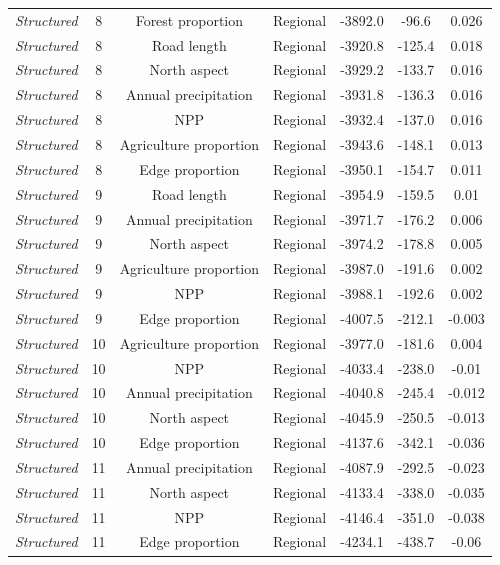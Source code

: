 \documentclass[preprint,final,times,12pt,3p]{elsarticle}
\begin{document}
\begin{longtable}{ c c c c c c c}
	\emph{Structured} & 8 & Forest proportion & Regional & -3892.0 & -96.6 & 0.026 \\
	\emph{Structured} & 8 & Road length & Regional & -3920.8 & -125.4 & 0.018 \\
	\emph{Structured} & 8 & North aspect & Regional & -3929.2 & -133.7 & 0.016 \\
	\emph{Structured} & 8 & Annual precipitation & Regional & -3931.8 & -136.3 & 0.016 \\
	\emph{Structured} & 8 & NPP & Regional & -3932.4 & -137.0 & 0.016 \\
	\emph{Structured} & 8 & Agriculture proportion & Regional & -3943.6 & -148.1 & 0.013 \\
	\emph{Structured} & 8 & Edge proportion & Regional & -3950.1 & -154.7 & 0.011 \\
	\emph{Structured} & 9 & Road length & Regional & -3954.9 & -159.5 & 0.01 \\
	\emph{Structured} & 9 & Annual precipitation & Regional & -3971.7 & -176.2 & 0.006 \\
	\emph{Structured} & 9 & North aspect & Regional & -3974.2 & -178.8 & 0.005 \\
	\emph{Structured} & 9 & Agriculture proportion & Regional & -3987.0 & -191.6 & 0.002 \\
	\emph{Structured} & 9 & NPP & Regional & -3988.1 & -192.6 & 0.002 \\
	\emph{Structured} & 9 & Edge proportion & Regional & -4007.5 & -212.1 & -0.003 \\
	\emph{Structured} & 10 & Agriculture proportion & Regional & -3977.0 & -181.6 & 0.004 \\
	\emph{Structured} & 10 & NPP & Regional & -4033.4 & -238.0 & -0.01 \\
	\emph{Structured} & 10 & Annual precipitation & Regional & -4040.8 & -245.4 & -0.012 \\
	\emph{Structured} & 10 & North aspect & Regional & -4045.9 & -250.5 & -0.013 \\
	\emph{Structured} & 10 & Edge proportion & Regional & -4137.6 & -342.1 & -0.036 \\
	\emph{Structured} & 11 & Annual precipitation & Regional & -4087.9 & -292.5 & -0.023 \\
	\emph{Structured} & 11 & North aspect & Regional & -4133.4 & -338.0 & -0.035 \\
	\emph{Structured} & 11 & NPP & Regional & -4146.4 & -351.0 & -0.038 \\
	\emph{Structured} & 11 & Edge proportion & Regional & -4234.1 & -438.7 & -0.06 \\

\end{longtable}
\end{document}
